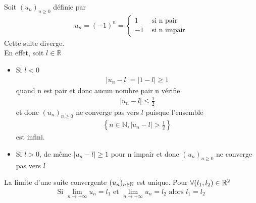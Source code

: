 \begin{exemple}
    Soit $(u_n)_{n \geqslant 0}$ définie par 
    \begin{align*}
        u_n = (-1)^n =
        \begin{cases}
        1 &\text{ si n pair} \\
        -1 &\text{ si n impair}
        \end{cases}
    \end{align*}
    Cette suite diverge. \\
    En effet, soit $l \in \mathbb{R}$
    \begin{itemize}
        \item Si $l < 0$
        \begin{align*}
            |u_n - l| = |1 - l| \geqslant 1
        \end{align*}
        quand n est pair et donc aucun nombre pair n vérifie
        \begin{align*}
            |u_n - l| \leqslant \frac{1}{2}
        \end{align*}
        et donc $(u_n)_{n \geqslant 0}$ ne converge pas vers $l$
        puisque l'ensemble  
        \begin{align*}
            \left\{n \in \mathbb{N}, |u_n - l| > \frac{1}{2}\right\}
        \end{align*}
        est infini.
        
        \item Si $l > 0$, de même $|u_n - l| \geqslant 1$ pour n impair et donc $(u_n)_{n \geqslant 0}$ ne converge pas vers $l$
    \end{itemize}
\end{exemple}

\begin{graybox}
    \begin{theoreme}
    La limite d'une suite convergente $(u_n)_{n \in \mathbb{N}}$ est unique. Pour $\forall (l_1, l_2) \in \mathbb{R}^2$
    \begin{align*}
        \text{Si } \lim_{n \to +\infty} u_n = l_1 \text{ et }\lim_{n \to +\infty} u_n = l_2 \text{ alors } l_1 = l_2
    \end{align*}
\end{theoreme}
\end{graybox}


